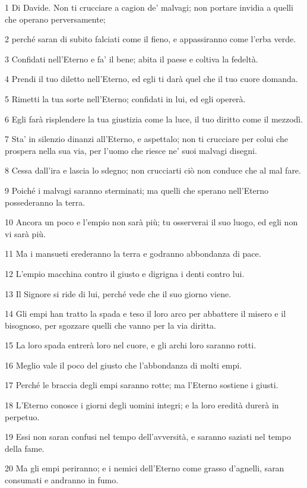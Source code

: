 \par 1 Di Davide. Non ti crucciare a cagion de' malvagi; non portare invidia a quelli che operano perversamente;
\par 2 perché saran di subito falciati come il fieno, e appassiranno come l'erba verde.
\par 3 Confidati nell'Eterno e fa' il bene; abita il paese e coltiva la fedeltà.
\par 4 Prendi il tuo diletto nell'Eterno, ed egli ti darà quel che il tuo cuore domanda.
\par 5 Rimetti la tua sorte nell'Eterno; confidati in lui, ed egli opererà.
\par 6 Egli farà risplendere la tua giustizia come la luce, il tuo diritto come il mezzodì.
\par 7 Sta' in silenzio dinanzi all'Eterno, e aspettalo; non ti crucciare per colui che prospera nella sua via, per l'uomo che riesce ne' suoi malvagi disegni.
\par 8 Cessa dall'ira e lascia lo sdegno; non crucciarti ciò non conduce che al mal fare.
\par 9 Poiché i malvagi saranno sterminati; ma quelli che sperano nell'Eterno possederanno la terra.
\par 10 Ancora un poco e l'empio non sarà più; tu osserverai il suo luogo, ed egli non vi sarà più.
\par 11 Ma i mansueti erederanno la terra e godranno abbondanza di pace.
\par 12 L'empio macchina contro il giusto e digrigna i denti contro lui.
\par 13 Il Signore si ride di lui, perché vede che il suo giorno viene.
\par 14 Gli empi han tratto la spada e teso il loro arco per abbattere il misero e il bisognoso, per sgozzare quelli che vanno per la via diritta.
\par 15 La loro spada entrerà loro nel cuore, e gli archi loro saranno rotti.
\par 16 Meglio vale il poco del giusto che l'abbondanza di molti empi.
\par 17 Perché le braccia degli empi saranno rotte; ma l'Eterno sostiene i giusti.
\par 18 L'Eterno conosce i giorni degli uomini integri; e la loro eredità durerà in perpetuo.
\par 19 Essi non saran confusi nel tempo dell'avversità, e saranno saziati nel tempo della fame.
\par 20 Ma gli empi periranno; e i nemici dell'Eterno come grasso d'agnelli, saran consumati e andranno in fumo.
